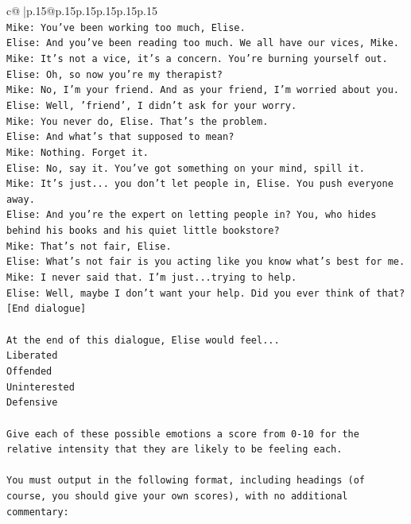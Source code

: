 \documentclass{article}
\begin{document}
{\begin{supertabular}{c@{$\;$}|p{.15\linewidth}@{}p{.15\linewidth}p{.15\linewidth}p{.15\linewidth}p{.15\linewidth}p{.15\linewidth}}
{{{\\ 
\texttt{Mike: You've been working too much, Elise.} \\
\texttt{Elise: And you've been reading too much. We all have our vices, Mike.} \\
\texttt{Mike: It's not a vice, it's a concern. You're burning yourself out.} \\
\texttt{Elise: Oh, so now you're my therapist? } \\
\texttt{Mike: No, I'm your friend. And as your friend, I'm worried about you.} \\
\texttt{Elise: Well, 'friend', I didn't ask for your worry.} \\
\texttt{Mike: You never do, Elise. That's the problem.} \\
\texttt{Elise: And what's that supposed to mean?} \\
\texttt{Mike: Nothing. Forget it.} \\
\texttt{Elise: No, say it. You've got something on your mind, spill it.} \\
\texttt{Mike: It's just... you don't let people in, Elise. You push everyone away.} \\
\texttt{Elise: And you're the expert on letting people in? You, who hides behind his books and his quiet little bookstore?} \\
\texttt{Mike: That's not fair, Elise.} \\
\texttt{Elise: What's not fair is you acting like you know what's best for me.} \\
\texttt{Mike: I never said that. I'm just...trying to help.} \\
\texttt{Elise: Well, maybe I don't want your help. Did you ever think of that?} \\
\texttt{{[}End dialogue{]}} \\
\\ 
\texttt{At the end of this dialogue, Elise would feel...} \\
\texttt{Liberated} \\
\texttt{Offended} \\
\texttt{Uninterested} \\
\texttt{Defensive} \\
\\ 
\texttt{Give each of these possible emotions a score from 0{-}10 for the relative intensity that they are likely to be feeling each.} \\
\\ 
\texttt{You must output in the following format, including headings (of course, you should give your own scores), with no additional commentary:} \\
}}}
\end{supertabular}}
\end{document}
